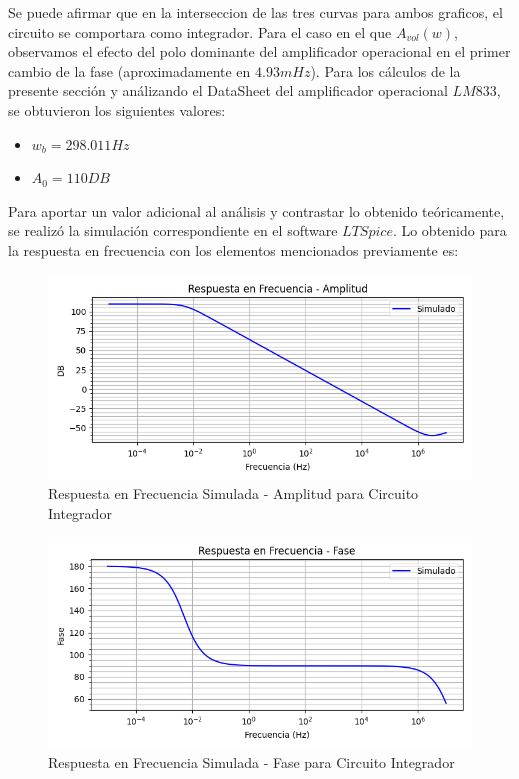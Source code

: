 Se puede afirmar que en la interseccion de las tres curvas para ambos graficos, el circuito se comportara como integrador. Para el caso en el que $A_{vol}(w)$, 
observamos el efecto del polo dominante del amplificador operacional en el primer cambio de la fase (aproximadamente en $4.93mHz$). 
Para los cálculos de la presente sección y análizando el DataSheet del amplificador operacional $LM833$, se obtuvieron los siguientes valores:

\begin{itemize}
	\item $w_b = 298.011 Hz$
	\item $A_0 = 110 DB$
\end{itemize}

Para aportar un valor adicional al análisis y contrastar lo obtenido teóricamente, se realizó la simulación correspondiente en el software $LTSpice$. 
Lo obtenido para la respuesta en frecuencia con los elementos mencionados previamente es:

\begin{figure}[H]
    \centering 
    \includegraphics [scale=1] {../Ejercicio3-CircuitoIntegradoresyDerivadores/Imagenes/simulado-integrador-amplitud.png} 
    \caption{Respuesta en Frecuencia Simulada - Amplitud para Circuito Integrador }
    \label{fig:emptyPlotTool}
\end{figure}

\begin{figure}[H]
    \centering 
    \includegraphics [scale=1] {../Ejercicio3-CircuitoIntegradoresyDerivadores/Imagenes/simulado-integrador-fase.png} 
    \caption{Respuesta en Frecuencia Simulada - Fase para Circuito Integrador  }
    \label{fig:emptyPlotTool}
\end{figure}


